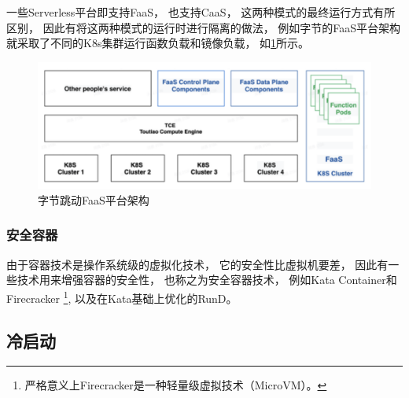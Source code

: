 一些Serverless平台即支持FaaS，
也支持CaaS，
这两种模式的最终运行方式有所区别，
因此有将这两种模式的运行时进行隔离的做法，
例如字节的FaaS平台架构就采取了不同的K8s集群运行函数负载和镜像负载，
如\cref{bytedance_faas_arch}所示。

\begin{figure}[ht!]
    \centering
    \includegraphics[width=0.7\linewidth]{images/bytedance_faas_arch.png}
    \caption{字节跳动FaaS平台架构\cite{bytedance_faas}}
    \label{bytedance_faas_arch}
\end{figure}

\subsubsection{安全容器}
由于容器技术是操作系统级的虚拟化技术，
它的安全性比虚拟机要差，
因此有一些技术用来增强容器的安全性，
也称之为安全容器技术，
例如Kata Container和Firecracker
\footnote{严格意义上Firecracker是一种轻量级虚拟技术（MicroVM）。},
以及在Kata基础上优化的RunD\cite{rund}。

\subsection{冷启动}